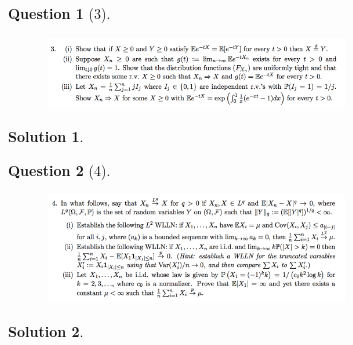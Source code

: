 \documentclass{article} %
\theoremstyle{quest}
\newtheorem*{question}{Question}
\newtheorem*{solution}{Solution}
\begin{document}
\newpage

\begin{question}[3]
\hfill
\begin{figure}[h!]
  \centering
    \includegraphics[width=0.7\textwidth]{prob-e5-p3.png}
\end{figure}
\end{question}
\begin{solution} \hfill \\
\end{solution}

\newpage

\begin{question}[4]
\hfill
\begin{figure}[h!]
  \centering
    \includegraphics[width=0.7\textwidth]{prob-e5-p4.png}
\end{figure}
\end{question}
\begin{solution} \hfill \\
\end{solution}
\end{document}
